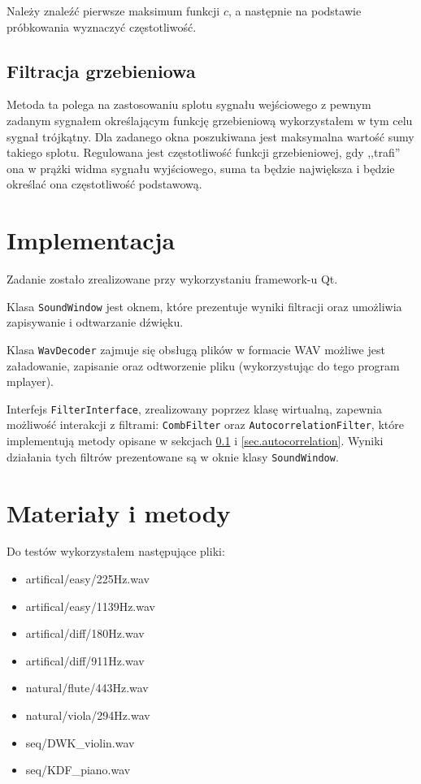 \documentclass{classrep}
\begin{document}
Należy znaleźć pierwsze maksimum funkcji $c$, a następnie na podstawie próbkowania wyznaczyć częstotliwość.

\subsection{Filtracja grzebieniowa}
\label{sec.comb}
Metoda ta polega na zastosowaniu splotu sygnału wejściowego z pewnym zadanym sygnałem określającym funkcję grzebieniową \ppauza wykorzystałem w tym celu sygnał trójkątny. Dla zadanego okna poszukiwana jest maksymalna wartość sumy takiego splotu. Regulowana jest częstotliwość funkcji grzebieniowej, gdy ,,trafi'' ona w prążki widma sygnału wyjściowego, suma ta będzie największa i będzie określać ona częstotliwość podstawową.

\section{Implementacja}
Zadanie zostało zrealizowane przy wykorzystaniu framework-u Qt.

Klasa \verb|SoundWindow| jest oknem, które prezentuje wyniki filtracji oraz umożliwia zapisywanie i odtwarzanie dźwięku.

Klasa \verb|WavDecoder| zajmuje się obsługą plików w formacie WAV \ppauza możliwe jest załadowanie, zapisanie oraz odtworzenie pliku (wykorzystując do tego program mplayer).

Interfejs \verb|FilterInterface|, zrealizowany poprzez klasę wirtualną, zapewnia możliwość interakcji z filtrami: \verb|CombFilter| oraz \verb|AutocorrelationFilter|, które implementują metody opisane w sekcjach \ref{sec.comb} i \ref{sec.autocorrelation}. Wyniki działania tych filtrów prezentowane są w oknie klasy \verb|SoundWindow|.

\section{Materiały i metody}
Do testów wykorzystałem następujące pliki:
\begin{itemize}
 \item artifical/easy/225Hz.wav
 \item artifical/easy/1139Hz.wav
 \item artifical/diff/180Hz.wav
 \item artifical/diff/911Hz.wav
 \item natural/flute/443Hz.wav
 \item natural/viola/294Hz.wav
 \item seq/DWK\_violin.wav
 \item seq/KDF\_piano.wav
\end{itemize}
\end{document}
